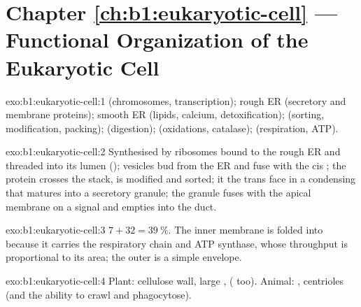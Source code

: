 \section*{Chapter \ref{ch:b1:eukaryotic-cell} --- Functional Organization of the Eukaryotic Cell}

\begin{solution}{exo:b1:eukaryotic-cell:1}
 (chromosomes, transcription); rough ER (secretory and membrane
proteins); smooth ER (lipids, calcium, detoxification);  (sorting,
modification, packing);  (digestion);  (oxidations,
catalase);  (respiration, ATP).
\end{solution}

\begin{solution}{exo:b1:eukaryotic-cell:2}
Synthesised by ribosomes bound to the rough ER and threaded into its
lumen (); vesicles bud from the ER and fuse with the cis
; the protein crosses the stack, is modified and sorted; it 
the trans face in a condensing  that matures into a secretory
granule; the granule fuses with the apical membrane on a signal and
empties into the duct.
\end{solution}

\begin{solution}{exo:b1:eukaryotic-cell:3}
$7 + 32 = \qty{39}{\%}$. The inner membrane is folded into 
because it carries the respiratory chain and ATP synthase, whose
throughput is proportional to its area; the outer is a simple envelope.
\end{solution}

\begin{solution}{exo:b1:eukaryotic-cell:4}
Plant: cellulose wall, large ,  ( too).
Animal: , centrioles (and the ability to crawl and
phagocytose).
\end{solution}

